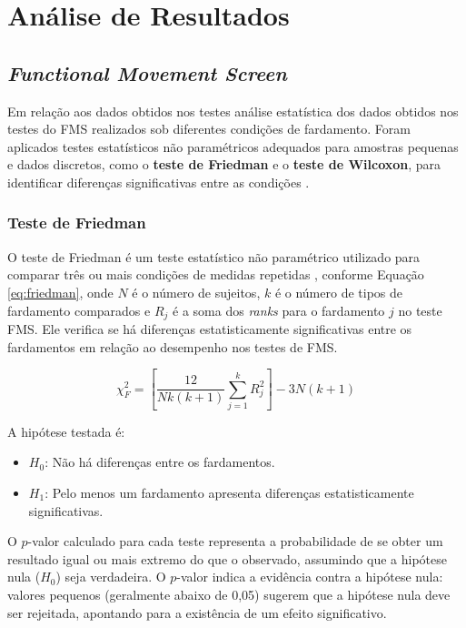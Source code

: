 \chapter{Análise de Resultados}

\section{\textit{Functional Movement Screen}}

    Em relação aos dados obtidos nos testes análise estatística dos dados obtidos nos testes do \acrlong{FMS} realizados sob diferentes condições de fardamento. Foram aplicados testes estatísticos não paramétricos adequados para amostras pequenas e dados discretos, como o \textbf{teste de Friedman} e o \textbf{teste de Wilcoxon}, para identificar diferenças significativas entre as condições \cite{azevedo2018metodos}.

    \subsection{Teste de Friedman}
        O teste de Friedman é um teste estatístico não paramétrico utilizado para comparar três ou mais condições de medidas repetidas \cite{sheldon1996use}, 
        conforme Equação \ref{eq:friedman}, onde 
    $N$ é o número de sujeitos,
    $k$ é o número de tipos de fardamento comparados e
    $R_j$ é a soma dos \textit{ranks} para o fardamento $j$ no teste FMS. Ele verifica se há diferenças estatisticamente significativas entre 
        os fardamentos em relação ao desempenho nos testes de FMS.

\begin{equation}
\chi_F^2 = \left[ \frac{12}{Nk(k+1)} \sum_{j=1}^{k} R_j^2 \right] - 3N(k+1)
\label{eq:friedman}
\end{equation}

        A hipótese testada é:
        \begin{itemize}
            \item $H_0$: Não há diferenças entre os fardamentos.
            \item $H_1$: Pelo menos um fardamento apresenta diferenças estatisticamente significativas.
            \end{itemize}
        
            O $p$-valor calculado para cada teste representa a probabilidade de se obter um resultado 
            igual ou mais extremo do que o observado, assumindo que a hipótese nula ($H_0$) seja verdadeira. 
            O $p$-valor indica a evidência contra a hipótese nula: valores pequenos (geralmente 
            abaixo de 0,05) sugerem que a hipótese nula deve ser rejeitada, apontando para a existência de um 
            efeito significativo.

